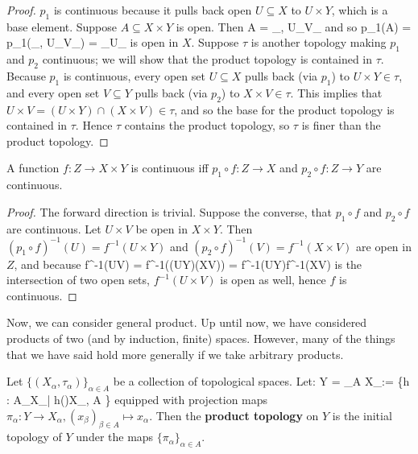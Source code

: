 	\begin{proof}
		$p_1$ is continuous because it pulls back open $U\subseteq X$ to $U\times Y$, which is a base element. Suppose $A\subseteq X\times Y$ is open. 
		Then
		\eq
			A = \bigcup_{\alpha, \beta}U_\alpha\times V_\beta
		\qe
		and so
		\eq
			p_1(A) = p_1\left(\bigcup_{\alpha, \beta}U_\alpha\times V_\beta \right) = \bigcup_\alpha U_\alpha
		\qe
		is open in $X$. Suppose $\tau$ is another topology making $p_1$ and $p_2$ continuous; we will show that the product topology is contained in 
		$\tau$. Because $p_1$ is continuous, every open set $U\subseteq X$ pulls back (via $p_1$) to $U\times Y\in \tau$, and every open set $V\subseteq 
		Y$ pulls back (via $p_2$) to $X\times V\in\tau$. This implies that $U\times V = (U\times Y)\cap (X\times V)\in\tau$, and so the base for the product 
		topology is contained in $\tau$. Hence $\tau$ contains the product topology, so $\tau$ is finer than the product topology.
	\end{proof}
	
	\begin{theorem}
		A function $f : Z\rightarrow X\times Y$ is continuous iff $p_1\circ f : Z\rightarrow X$ and $p_2\circ f : Z\rightarrow Y$ are continuous.
	\end{theorem}
	
	\begin{proof}
		The forward direction is trivial. Suppose the converse, that $p_1\circ f$ and $p_2\circ f$ are continuous. Let $U\times V$ be open in $X\times Y$. 
		Then $(p_1\circ f)^{-1}(U) = f^{-1}(U\times Y)$ and $(p_2\circ f)^{-1}(V) = f^{-1}(X\times V)$ are open in $Z$, and because
		\eq
			f^{-1}(U\times V) = f^{-1}((U\times Y)\cap (X\times V)) = f^{-1}(U\times Y)\cap f^{-1}(X\times V)
		\qe
		is the intersection of two open sets, $f^{-1}(U\times V)$ is open as well, hence $f$ is continuous.
	\end{proof}
	
	Now, we can consider general product. Up until now, we have considered products of two (and by induction, finite) spaces. However, many of the things that 
	we have said hold more generally if we take arbitrary products.
	
	\begin{definition}
		Let $\{(X_\alpha, \tau_\alpha)\}_{\alpha\in A}$ be a collection of topological spaces. Let:
		\eq
			Y = \prod_{\alpha\in A} X_\alpha := \left\{h : A\rightarrow\bigoplus_\alpha X_\alpha | h(\alpha)\in X_\alpha, \forall\alpha\in A \right\}
		\qe
		equipped with projection maps $\pi_\alpha : Y\rightarrow X_\alpha, (x_\beta)_{\beta\in A}\mapsto x_\alpha$. Then the \textbf{product topology} on $Y$ 
		is the initial topology of $Y$ under the maps $\{\pi_\alpha\}_{\alpha\in A}$.
	\end{definition}
	

